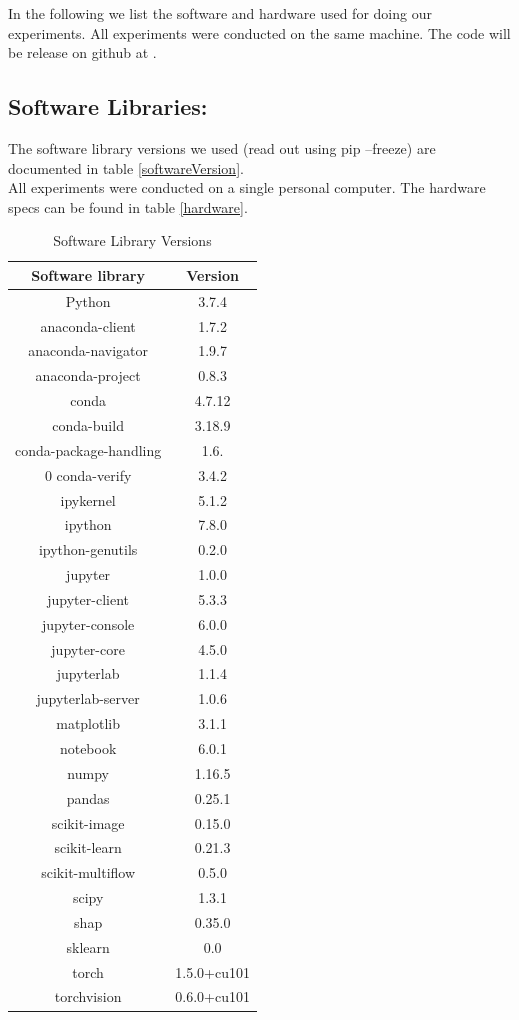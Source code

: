 \documentclass[conference]{IEEEtran}
\begin{document}
In the following we list the software and hardware used for doing our experiments. 
All experiments were conducted on the same machine.
The code will be release on github at \cite{b17}.

\subsection{Software Libraries:}
The software library versions we used (read out using pip --freeze) are documented in table \ref{softwareVersion}.\\
All experiments were conducted on a single personal computer. The hardware specs can be found in table \ref{hardware}.\\


\begin{table}[htbp]
\caption{Software Library Versions}
\begin{center}
\begin{tabular}{|c|c|}
	\hline
	\textbf{Software library} & \textbf{Version} \\
	\hline
	Python & 3.7.4\\ \hline
	anaconda-client & 1.7.2 \\ \hline
	anaconda-navigator & 1.9.7 \\ \hline
	anaconda-project & 0.8.3\\ \hline
	conda & 4.7.12\\ \hline
	conda-build & 3.18.9\\ \hline
	conda-package-handling & 1.6.\\ \hline0
	conda-verify & 3.4.2\\ \hline
	ipykernel & 5.1.2\\ \hline
	ipython & 7.8.0\\ \hline
	ipython-genutils & 0.2.0\\ \hline
	jupyter & 1.0.0\\ \hline
	jupyter-client & 5.3.3\\ \hline
	jupyter-console & 6.0.0\\ \hline
	jupyter-core & 4.5.0\\ \hline
	jupyterlab & 1.1.4\\ \hline
	jupyterlab-server & 1.0.6\\ \hline
	matplotlib & 3.1.1\\ \hline
	notebook & 6.0.1\\ \hline
	numpy & 1.16.5\\ \hline
	pandas & 0.25.1\\ \hline
	scikit-image & 0.15.0\\ \hline
	scikit-learn & 0.21.3\\ \hline
	scikit-multiflow & 0.5.0\\ \hline                 
	scipy & 1.3.1\\ \hline
	shap & 0.35.0\\ \hline
	sklearn & 0.0\\ \hline
	torch & 1.5.0+cu101\\ \hline
	torchvision & 0.6.0+cu101  \\ \hline
	

\end{tabular}
\end{center}
\end{table}
\end{document}
